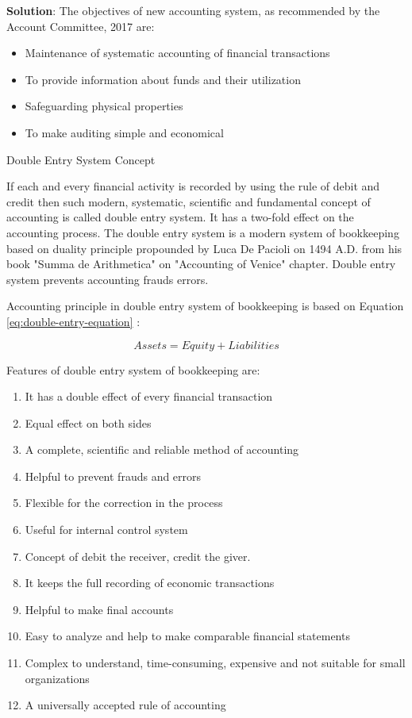 \documentclass[
  openany]{book}
\newenvironment{solution}{ {\bfseries Solution}:}{}
\begin{document}
\begin{questions}
\begin{solution}
The objectives of new accounting system, as recommended by the Account Committee, 2017 are:

\begin{itemize}
\item Maintenance of systematic accounting of financial transactions
\item To provide information about funds and their utilization
\item Safeguarding physical properties
\item To make auditing simple and economical
\end{itemize}

Double Entry System Concept

If each and every financial activity is recorded by using the rule of debit and credit then such modern, systematic, scientific and fundamental concept of accounting is called double entry system. It has a two-fold effect on the accounting process. The double entry system is a modern system of bookkeeping based on duality principle propounded by Luca De Pacioli on 1494 A.D. from his book "Summa de Arithmetica" on "Accounting of Venice" chapter. Double entry system prevents accounting frauds errors.

Accounting principle in double entry system of bookkeeping is based on Equation \ref{eq:double-entry-equation} :

\begin{equation}
Assets = Equity + Liabilities
\label{eq:double-entry-equation}
\end{equation}

Features of double entry system of bookkeeping are:

\begin{enumerate}
\item It has a double effect of every financial transaction
\item Equal effect on both sides
\item A complete, scientific and reliable method of accounting
\item Helpful to prevent frauds and errors
\item Flexible for the correction in the process
\item Useful for internal control system
\item Concept of debit the receiver, credit the giver.
\item It keeps the full recording of economic transactions
\item Helpful to make final accounts
\item Easy to analyze and help to make comparable financial statements
\item Complex to understand, time-consuming, expensive and not suitable for small organizations
\item A universally accepted rule of accounting
\end{enumerate}
\end{solution}


\end{questions}
\end{document}
